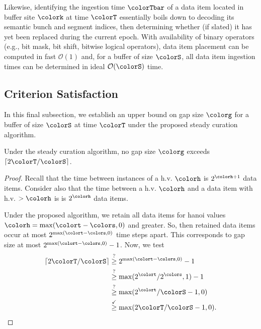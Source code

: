 
Likewise, identifying the ingestion time $\colorTbar$ of a data item located in buffer site $\colork$ at time $\colorT$ essentially boils down to decoding its semantic bunch and segment indices, then determining whether (if slated) it has yet been replaced during the current epoch.
With availability of binary operators (e.g., bit mask, bit shift, bitwise logical operators), data item placement can be computed in fast $\mathcal{O}(1)$ and, for a buffer of size $\colorS$, all data item ingestion times can be determined in ideal $\mathcal{O}(\colorS)$ time.

\subsection{Criterion Satisfaction}

In this final subsection, we establish an upper bound on gap size $\colorg$ for a buffer of size $\colorS$ at time $\colorT$ under the proposed steady curation algorithm.

\begin{theorem}
\label{thm:steady-gap-size}
Under the steady curation algorithm, no gap size $\colorg$ exceeds $\left\lceil 2 \colorT / \colorS \right\rceil$.
\end{theorem}
\begin{proof}
Recall that the time between instances of a h.v. $\colorh$ is $2^{\colorh + 1}$ data items.
Consider also that the time between a h.v. $\colorh$ and a data item with h.v. $>\colorh$ is is $2^{\colorh}$ data items.

Under the proposed algorithm, we retain all data items for hanoi values $\colorh = \max (\colort - \colors, 0)$ and greater.
So, then retained data items occur at most $2^{\max(\colort - \colors, 0)}$ time steps apart.
This corresponds to gap size at most $2^{\max(\colort - \colors, 0)} - 1$.
Now, we test
\begin{align*}
\left\lceil 2 \colorT / \colorS \right\rceil
&\stackrel{?}{\geq}
2^{\max(\colort - \colors, 0)} - 1\\
&\stackrel{?}{\geq}
\max(2^{\colort} / 2^{\colors}, 1) - 1\\
&\stackrel{?}{\geq}
\max(2^{\colort} / \colorS - 1, 0)\\
&\stackrel{\checkmark}{\geq}
\max(2\colorT / \colorS - 1, 0).
\end{align*}
\end{proof}

